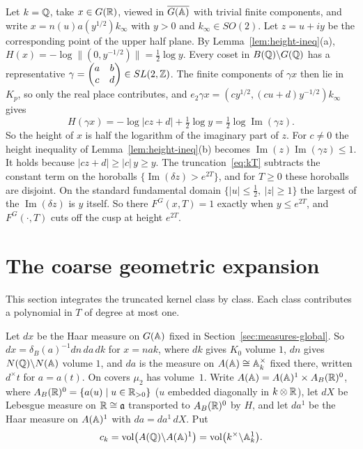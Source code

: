 \begin{example}\label{ex:trunc-Q}
Let $k=\mathbb{Q}$, take $x\in G(\mathbb{R})$, viewed in $\overline{G(\mathbb{A})}$ with trivial finite
components, and write $x=n(u)a(y^{1/2})k_\infty$ with $y>0$ and
$k_\infty\in SO(2)$. Let $z=u+iy$ be the corresponding point of the upper
half plane. By Lemma~\ref{lem:height-ineq}(a),
$H(x)=-\log\|(0,y^{-1/2})\|=\frac12\log y$. Every coset in
$B(\mathbb{Q})\backslash G(\mathbb{Q})$ has a representative
$\gamma=\begin{pmatrix}a&b\\c&d\end{pmatrix}\in SL(2,\mathbb{Z})$. The finite
components of $\gamma x$ then lie in $K_p$, so only the real place
contributes, and $e_2\gamma x=(c y^{1/2},(cu+d)y^{-1/2})k_\infty$ gives
\[
H(\gamma x)=-\log|cz+d|+\tfrac12\log y=\tfrac12\log\operatorname{Im}(\gamma z).
\]
So the height of $x$ is half the logarithm of the imaginary part of $z$.
For $c\ne0$ the height inequality of Lemma~\ref{lem:height-ineq}(b)
becomes $\operatorname{Im}(z)\operatorname{Im}(\gamma z)\le1$. It holds
because $|cz+d|\ge|c|\,y\ge y$. The truncation~\eqref{eq:kT} subtracts the
constant term on the horoballs $\{\operatorname{Im}(\delta z)>e^{2T}\}$,
and for $T\ge0$ these horoballs are disjoint. On the standard fundamental
domain $\{|u|\le\frac12,\ |z|\ge1\}$ the largest of the
$\operatorname{Im}(\delta z)$ is $y$ itself. So there $F^G(x,T)=1$
exactly when $y\le e^{2T}$, and $F^G(\cdot,T)$ cuts off the cusp at
height $e^{2T}$.
\end{example}


\section{The coarse geometric expansion}\label{sec:coarse}

This section integrates the truncated kernel class by class. Each
class contributes a polynomial in $T$ of degree at most one.


Let $dx$ be the Haar measure on $G(\mathbb{A})$ fixed in
Section~\ref{sec:measures-global}. So $dx=\delta_B(a)^{-1}dn\,da\,dk$
for $x=nak$, where $dk$ gives $K_0$
volume $1$, $dn$ gives $N(\mathbb{Q})\backslash N(\mathbb{A})$ volume $1$, and $da$ is the
measure on $A(\mathbb{A})\cong\mathbb{A}_k^\times$ fixed there, written
$d^\times t$ for $a=a(t)$. On covers
$\mu_2$ has volume~$1$. Write $A(\mathbb{A})=A(\mathbb{A})^1\times A_B(\mathbb{R})^0$, where
$A_B(\mathbb{R})^0=\{a(u)\mid u\in\mathbb{R}_{>0}\}$ ($u$ embedded diagonally in
$k\otimes\mathbb{R}$), let $dX$ be Lebesgue measure on $\mathbb{R}\cong\mathfrak a$
transported to $A_B(\mathbb{R})^0$ by $H$, and let $da^1$ be the Haar measure on
$A(\mathbb{A})^1$ with $da=da^1\,dX$. Put
\[
c_k=\operatorname{vol}\bigl(A(\mathbb{Q})\backslash A(\mathbb{A})^1\bigr)
=\operatorname{vol}\bigl(k^\times\backslash\mathbb{A}_k^1\bigr).
\]

